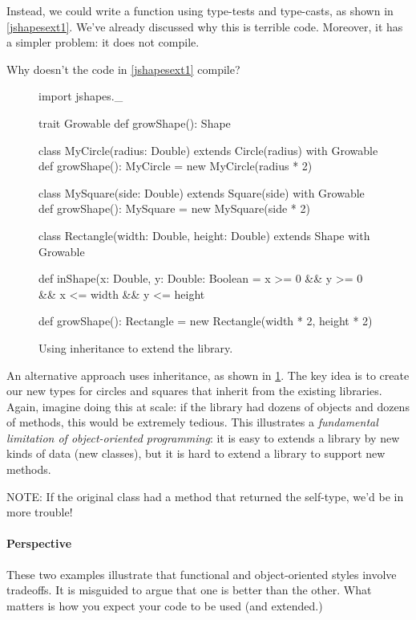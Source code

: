 \documentclass{book}
\begin{document}
Instead, we could write a  function using
type-tests and type-casts, as shown in \cref{jshapesext1}. We've already
discussed why this is terrible code. Moreover, it has a simpler problem: it
does not compile.

\begin{think}
Why doesn't the code in \cref{jshapesext1} compile?
\end{think}

\begin{figure}
\begin{scalacode}
import jshapes._

trait Growable {
  def growShape(): Shape
}

class MyCircle(radius: Double) extends Circle(radius) with Growable {
  def growShape(): MyCircle = new MyCircle(radius * 2)
}

class MySquare(side: Double) extends Square(side) with Growable {
  def growShape(): MySquare = new MySquare(side * 2)
}

class Rectangle(width: Double, height: Double) extends Shape with Growable {
  def inShape(x: Double, y: Double: Boolean = x >= 0 && y >= 0 && x <= width && y <= height

  def growShape(): Rectangle = new Rectangle(width * 2, height * 2)
}
\end{scalacode}
\caption{Using inheritance to extend the library.}
\label{jshapesext2}
\end{figure}

An alternative approach uses inheritance, as shown
in \cref{jshapesext2}. The key idea is to create our new types for circles
and squares that inherit from the existing libraries.
Again, imagine doing this at scale: if the library had dozens of objects
and dozens of methods, this would be extremely tedious.
 This illustrates a \emph{fundamental limitation of
object-oriented programming}: it is easy to extends a library by new
kinds of data (new classes), but it is hard to extend a library to support
new methods.

\begin{instructor}
NOTE: If the original class had a method that returned the self-type, we'd
be in more trouble!
\end{instructor}

\paragraph{Perspective} These two examples illustrate that functional
and object-oriented styles involve tradeoffs. It is misguided to argue that
one is better than the other. What matters is how you expect your code
to be used (and extended.)
\end{document}

